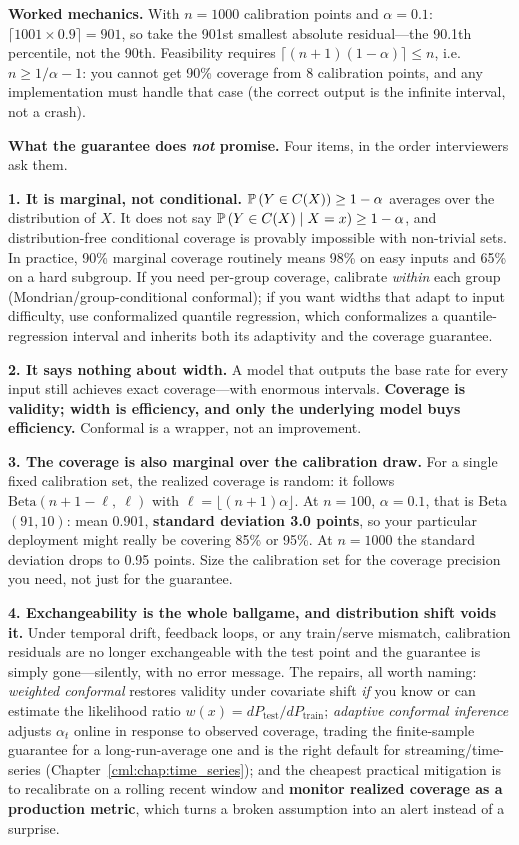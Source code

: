 \textbf{Worked mechanics.} With $n = 1000$ calibration points and $\alpha = 0.1$: $\lceil 1001 \times 0.9 \rceil = 901$, so take the 901st smallest absolute residual---the 90.1th percentile, not the 90th. Feasibility requires $\lceil (n+1)(1-\alpha)\rceil \le n$, i.e.\ $n \ge 1/\alpha - 1$: you cannot get 90\% coverage from 8 calibration points, and any implementation must handle that case (the correct output is the infinite interval, not a crash).

\begin{warningbox}
\textbf{What the guarantee does \textit{not} promise.} Four items, in the order interviewers ask them.

\textbf{1. It is marginal, not conditional.} $\mathbb{P}\left(Y \in C(X)\right) \ge 1-\alpha$ averages over the distribution of $X$. It does not say $\mathbb{P}\left(Y \in C(X) \mid X = x\right) \ge 1-\alpha$, and distribution-free conditional coverage is provably impossible with non-trivial sets. In practice, 90\% marginal coverage routinely means 98\% on easy inputs and 65\% on a hard subgroup. If you need per-group coverage, calibrate \textit{within} each group (Mondrian/group-conditional conformal); if you want widths that adapt to input difficulty, use conformalized quantile regression, which conformalizes a quantile-regression interval and inherits both its adaptivity and the coverage guarantee.

\textbf{2. It says nothing about width.} A model that outputs the base rate for every input still achieves exact coverage---with enormous intervals. \textbf{Coverage is validity; width is efficiency, and only the underlying model buys efficiency.} Conformal is a wrapper, not an improvement.

\textbf{3. The coverage is also marginal over the calibration draw.} For a single fixed calibration set, the realized coverage is random: it follows $\text{Beta}(n+1-\ell,\ \ell)$ with $\ell = \lfloor (n+1)\alpha \rfloor$. At $n = 100$, $\alpha = 0.1$, that is Beta$(91,10)$: mean 0.901, \textbf{standard deviation 3.0 points}, so your particular deployment might really be covering 85\% or 95\%. At $n = 1000$ the standard deviation drops to 0.95 points. Size the calibration set for the coverage precision you need, not just for the guarantee.

\textbf{4. Exchangeability is the whole ballgame, and distribution shift voids it.} Under temporal drift, feedback loops, or any train/serve mismatch, calibration residuals are no longer exchangeable with the test point and the guarantee is simply gone---silently, with no error message. The repairs, all worth naming: \textit{weighted conformal} restores validity under covariate shift \textit{if} you know or can estimate the likelihood ratio $w(x) = dP_{\text{test}}/dP_{\text{train}}$; \textit{adaptive conformal inference} adjusts $\alpha_t$ online in response to observed coverage, trading the finite-sample guarantee for a long-run-average one and is the right default for streaming/time-series (Chapter~\ref{cml:chap:time_series}); and the cheapest practical mitigation is to recalibrate on a rolling recent window and \textbf{monitor realized coverage as a production metric}, which turns a broken assumption into an alert instead of a surprise.
\end{warningbox}


